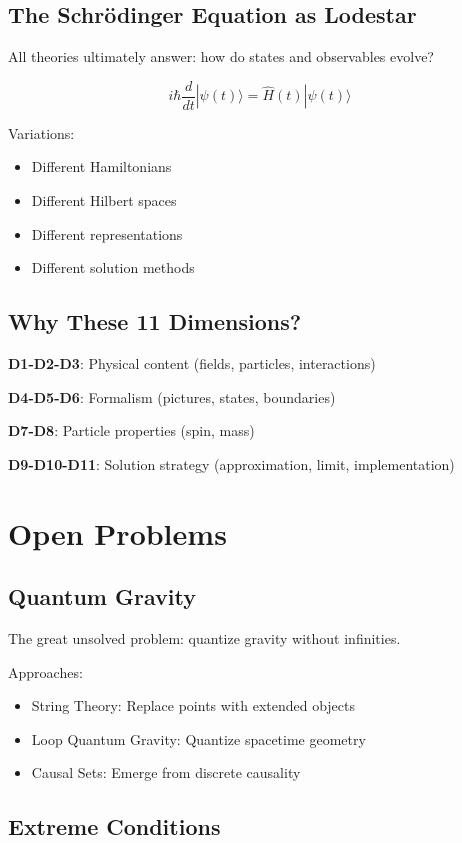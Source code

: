 \documentclass[12pt,oneside]{book}
\begin{document}
\section{The Schrödinger Equation as Lodestar}

All theories ultimately answer: how do states and observables evolve?

$$i\hbar\frac{d}{dt}|\psi(t)\rangle = \hat{H}(t)|\psi(t)\rangle$$

Variations:
\begin{itemize}
  \item Different Hamiltonians
  \item Different Hilbert spaces
  \item Different representations
  \item Different solution methods
\end{itemize}

\section{Why These 11 Dimensions?}

\textbf{D1-D2-D3}: Physical content (fields, particles, interactions)

\textbf{D4-D5-D6}: Formalism (pictures, states, boundaries)

\textbf{D7-D8}: Particle properties (spin, mass)

\textbf{D9-D10-D11}: Solution strategy (approximation, limit, implementation)

\chapter{Open Problems}

\section{Quantum Gravity}

The great unsolved problem: quantize gravity without infinities.

Approaches:
\begin{itemize}
  \item String Theory: Replace points with extended objects
  \item Loop Quantum Gravity: Quantize spacetime geometry
  \item Causal Sets: Emerge from discrete causality
\end{itemize}

\section{Extreme Conditions}
\end{document}
